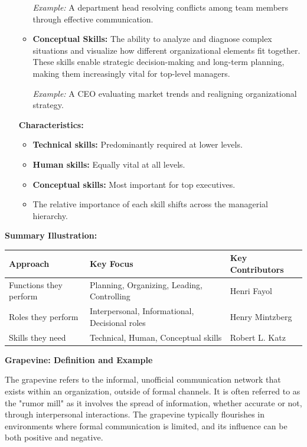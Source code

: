 \documentclass[12pt,a4paper]{book}
\begin{document}
\begin{enumerate}
\begin{itemize}
        \textit{Example:} A department head resolving conflicts among team members through effective communication.

        \item \textbf{Conceptual Skills:}
        The ability to analyze and diagnose complex situations and visualize how different organizational elements fit together. These skills enable strategic decision-making and long-term planning, making them increasingly vital for top-level managers.

        \textit{Example:} A CEO evaluating market trends and realigning organizational strategy.
    \end{itemize}

    \textbf{Characteristics:}
    \begin{itemize}
        \item \textbf{Technical skills:} Predominantly required at lower levels.
        \item \textbf{Human skills:} Equally vital at all levels.
        \item \textbf{Conceptual skills:} Most important for top executives.
        \item The relative importance of each skill shifts across the managerial hierarchy.
    \end{itemize}

\end{enumerate}

\textbf{Summary Illustration:}

\begin{tabular}{|p{5cm}|p{5cm}|p{5cm}|}
\hline
\textbf{Approach} & \textbf{Key Focus} & \textbf{Key Contributors} \\
\hline
Functions they perform & Planning, Organizing, Leading, Controlling & Henri Fayol \\
\hline
Roles they perform & Interpersonal, Informational, Decisional roles & Henry Mintzberg \\
\hline
Skills they need & Technical, Human, Conceptual skills & Robert L. Katz \\
\hline
\end{tabular}

\textbf{Grapevine: Definition and Example}

The grapevine refers to the informal, unofficial communication network that exists within an organization, outside of formal channels. It is often referred to as the "rumor mill" as it involves the spread of information, whether accurate or not, through interpersonal interactions. The grapevine typically flourishes in environments where formal communication is limited, and its influence can be both positive and negative. 
\end{document}
